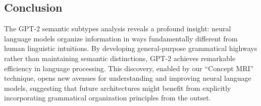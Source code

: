 \subsection{Conclusion}

The GPT-2 semantic subtypes analysis reveals a profound insight: neural language models organize information in ways fundamentally different from human linguistic intuitions. By developing general-purpose grammatical highways rather than maintaining semantic distinctions, GPT-2 achieves remarkable efficiency in language processing. This discovery, enabled by our ``Concept MRI'' technique, opens new avenues for understanding and improving neural language models, suggesting that future architectures might benefit from explicitly incorporating grammatical organization principles from the outset.